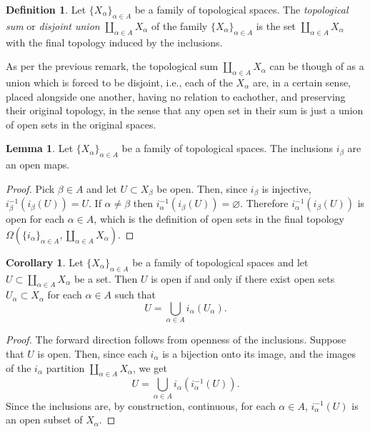 \documentclass{book}
\theoremstyle{definition}
\newtheorem{corollary}{Corollary}[theorem]
\newtheorem{lemma}[theorem]{Lemma}
\newtheorem{definition}{Definition}[section]
\theoremstyle{remark}
\newcommand{\final}[2]{\Omega(#2, #1)}
\begin{document}
\begin{definition}
Let $\{X_\alpha\}_{\alpha\in A}$ be a family of topological spaces. The \textit{topological sum} or \textit{disjoint union} $\coprod_{\alpha\in A}X_\alpha$ of the family $\{X_\alpha\}_{\alpha\in A}$ is the set $\coprod_{\alpha\in A}X_\alpha$ with the final topology induced by the inclusions.
\end{definition}

As per the previous remark, the topological sum $\coprod_{\alpha\in A}X_\alpha$ can be though of as a union which is forced to be disjoint, i.e., each of the $X_\alpha$ are, in a certain sense, placed alongside one another, having no relation to eachother, and preserving their original topology, in the sense that any open set in their sum is just a union of open sets in the original spaces.

\begin{lemma}
Let $\{X_\alpha\}_{\alpha\in A}$ be a family of topological spaces. The inclusions $i_\beta$ are an open maps.
\end{lemma}
\begin{proof}
Pick $\beta\in A$ and let $U\subset X_\beta$ be open. Then, since $i_\beta$ is injective, $i_\beta^{-1}(i_\beta(U))=U$. If $\alpha\neq\beta$ then $i_\alpha^{-1}(i_\beta(U))=\varnothing$. Therefore $i_\alpha^{-1}(i_\beta(U))$ is open for each $\alpha\in A$, which is the definition of open sets in the final topology $\final{\coprod_{\alpha\in A} X_\alpha}{\{i_\alpha\}_{\alpha\in A}}$.
\end{proof}

\begin{corollary}
Let $\{X_\alpha\}_{\alpha\in A}$ be a family of topological spaces and let $U\subset\coprod_{\alpha\in A}X_\alpha$ be a set. Then $U$ is open if and only if there exist open sets $U_\alpha\subset X_\alpha$ for each $\alpha\in A$ such that
$$U=\bigcup_{\alpha\in A}i_\alpha(U_\alpha).$$
\end{corollary}
\begin{proof}
The forward direction follows from openness of the inclusions. Suppose that $U$ is open. Then, since each $i_\alpha$ is a bijection onto its image, and the images of the $i_\alpha$ partition $\coprod_{\alpha\in A}X_\alpha$, we get
    $$U=\bigcup_{\alpha\in A} i_\alpha(i_\alpha^{-1}(U)).$$
Since the inclusions are, by construction, continuous, for each $\alpha\in A$, $i_\alpha^{-1}(U)$ is an open subset of $X_\alpha$.
\end{proof}
\end{document}
